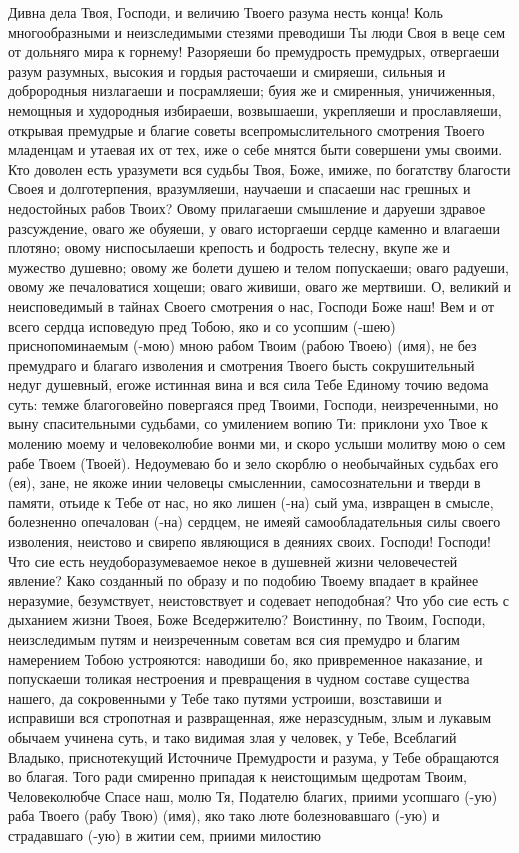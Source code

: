 \mychapterending

 


Дивна дела Твоя, Господи, и величию Твоего разума несть конца! Коль многообразными и неизследимыми стезями преводиши Ты люди Своя в веце сем от дольняго мира к горнему! Разоряеши бо премудрость премудрых, отвергаеши разум разумных, высокия и гордыя расточаеши и смиряеши, сильныя и доброродныя низлагаеши и посрамляеши; буия же и смиренныя, уничиженныя, немощныя и худородныя избираеши, возвышаеши, укрепляеши и прославляеши, открывая премудрые и благие советы всепромыслительного смотрения Твоего младенцам и утаевая их от тех, иже о себе мнятся быти совершени умы своими. Кто доволен есть уразумети вся судьбы Твоя, Боже, имиже, по богатству благости Своея и долготерпения, вразумляеши, научаеши и спасаеши нас грешных и недостойных рабов Твоих? Овому прилагаеши смышление и даруеши здравое разсуждение, оваго же обуяеши, у оваго исторгаеши сердце каменно и влагаеши плотяно; овому ниспосылаеши крепость и бодрость телесну, вкупе же и мужество душевно; овому же болети душею и телом попускаеши; оваго радуеши, овому же печаловатися хощеши; оваго живиши, оваго же мертвиши. О, великий и неисповедимый в тайнах Своего смотрения о нас, Господи Боже наш! Вем и от всего сердца исповедую пред Тобою, яко и со усопшим (-шею) приснопоминаемым (-мою) мною рабом Твоим (рабою Твоею) (имя), не без премудраго и благаго изволения и смотрения Твоего бысть сокрушительный недуг душевный, егоже истинная вина и вся сила Тебе Единому точию ведома суть: темже благоговейно повергаяся пред Твоими, Господи, неизреченными, но выну спасительными судьбами, со умилением вопию Ти: приклони ухо Твое к молению моему и человеколюбие вонми ми, и скоро услыши молитву мою о сем рабе Твоем (Твоей). Недоумеваю бо и зело скорблю о необычайных судьбах его (ея), зане, не якоже инии человецы смысленнии, самосознательни и тверди в памяти, отьиде к Тебе от нас, но яко лишен (-на) сый ума, извращен в смысле, болезненно опечалован (-на) сердцем, не имеяй самообладательныя силы своего изволения, неистово и свирепо являющися в деяниях своих. Господи! Господи! Что сие есть неудоборазумеваемое некое в душевней жизни человечестей явление? Како созданный по образу и по подобию Твоему впадает в крайнее неразумие, безумствует, неистовствует и содевает неподобная? Что убо сие есть с дыханием жизни Твоея, Боже Вседержителю? Воистинну, по Твоим, Господи, неизследимым путям и неизреченным советам вся сия премудро и благим намерением Тобою устрояются: наводиши бо, яко привременное наказание, и попускаеши толикая нестроения и превращения в чудном составе существа нашего, да сокровенными у Тебе тако путями устроиши, возставиши и исправиши вся стропотная и развращенная, яже неразсудным, злым и лукавым обычаем учинена суть, и тако видимая злая у человек, у Тебе, Всеблагий Владыко, приснотекущий Источниче Премудрости и разума, у Тебе обращаются во благая. Того ради смиренно припадая к неистощимым щедротам Твоим, Человеколюбче Спасе наш, молю Тя, Подателю благих, приими усопшаго (-ую) раба Твоего (рабу Твою) (имя), яко тако люте болезновавшаго (-ую) и страдавшаго (-ую) в житии сем, приими милостию 